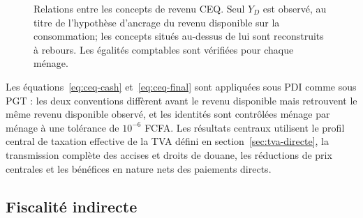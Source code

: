 \documentclass[11pt,a4paper]{article}
\begin{document}
\begin{figure}[t]
\centering
{}
\caption{Relations entre les concepts de revenu CEQ. Seul $Y_D$ est observé, au
titre de l'hypothèse d'ancrage du revenu disponible sur la consommation; les
concepts situés au-dessus de lui sont reconstruits à rebours. Les égalités
comptables sont vérifiées pour chaque ménage.}
\label{fig:ceq-cascade}
\end{figure}
Les équations~\eqref{eq:ceq-cash} et~\eqref{eq:ceq-final} sont appliquées sous
PDI comme sous PGT : les deux conventions diffèrent avant le revenu disponible
mais retrouvent le même revenu disponible observé, et les identités sont
contrôlées ménage par ménage à une tolérance de $10^{-6}$ FCFA. Les résultats
centraux utilisent le profil central de taxation effective de la TVA défini en
section~\ref{sec:tva-directe}, la transmission complète des accises et droits
de douane, les réductions de prix centrales et les bénéfices en nature nets des
paiements directs.

\subsection{Fiscalité indirecte}
\label{sec:indirecte}
\end{document}

